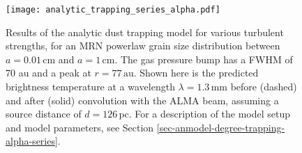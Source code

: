 \documentclass{aa}
\begin{document}
\begin{figure}
\centerline{\texttt{[image: analytic\_trapping\_series\_alpha.pdf]}}
\caption{\label{fig-anmodel-series-alpha}Results of the analytic dust trapping
  model for various turbulent strengths, for an MRN powerlaw grain size
  distribution between $a=0.01\,\mathrm{cm}$ and $a=1\,\mathrm{cm}$. The gas
  pressure bump has a FWHM of 70 au and a peak at $r=77\,\mathrm{au}$. Shown
  here is the predicted brightness temperature at a wavelength
  $\lambda=1.3\,\mathrm{mm}$ before (dashed) and after (solid) convolution with
  the ALMA beam, assuming a source distance of $d=126\,\mathrm{pc}$. For a
  description of the model setup and model parameters, see Section
  \ref{sec-anmodel-degree-trapping-alpha-series}.}
\end{figure}
 
\end{document}
